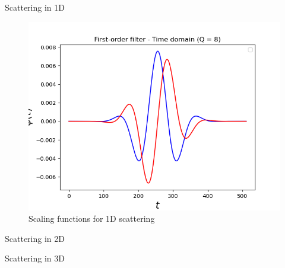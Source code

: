 \documentclass{article}
\begin{document}
\begin{section}{Scattering in 1D}
    \begin{figure}
        \includegraphics{scaling-function-t-1d.png}
        \caption{Scaling functions for 1D scattering}
    \end{figure}

\end{section}

\begin{section}{Scattering in 2D}

\end{section}

\begin{section}{Scattering in 3D}

\end{section}
\end{document}
